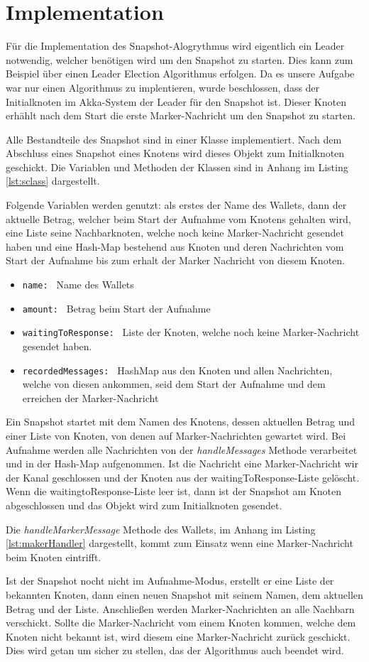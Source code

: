 \section{Implementation}
\label{sec:impl}
Für die Implementation des Snapshot-Alogrythmus wird eigentlich ein Leader 
notwendig, welcher benötigen wird um den Snapshot zu starten. Dies kann zum
Beispiel über einen Leader Election Algorithmus erfolgen. Da es unsere Aufgabe
war nur einen Algorithmus zu implentieren, wurde beschlossen, dass der 
Initialknoten im Akka-System der Leader für den Snapshot ist. Dieser Knoten 
erhählt nach dem Start die erste Marker-Nachricht um den Snapshot zu starten.

Alle Bestandteile des Snapshot sind in einer Klasse implementiert. Nach dem
Abschluss eines Snapshot eines Knotens wird dieses Objekt zum Initialknoten
geschickt.
Die Variablen und Methoden der Klassen sind in Anhang im Listing \ref{lst:sclass} 
dargestellt.

Folgende Variablen werden genutzt: als erstes der Name des Wallets, dann
der aktuelle Betrag, welcher beim Start der Aufnahme vom Knotens gehalten wird,
eine Liste seine Nachbarknoten, welche noch keine Marker-Nachricht gesendet
haben und eine Hash-Map bestehend aus Knoten und deren Nachrichten vom Start
der Aufnahme bis zum erhalt der Marker Nachricht von diesem Knoten.

\begin{itemize}
 \item \texttt{name: } Name des Wallets
 \item \texttt{amount: } Betrag beim Start der Aufnahme
 \item \texttt{waitingToResponse: } Liste der Knoten, welche noch keine 
 Marker-Nachricht gesendet haben.
 \item \texttt{recordedMessages: } HashMap aus den Knoten und allen Nachrichten, 
 welche von diesen ankommen, seid dem Start der Aufnahme und dem erreichen der
 Marker-Nachricht
\end{itemize}

Ein Snapshot startet mit dem Namen des Knotens, dessen aktuellen Betrag und 
einer Liste von Knoten, von denen auf Marker-Nachrichten gewartet wird.
Bei Aufnahme werden alle Nachrichten von der \textit{handleMessages} Methode
verarbeitet und in der Hash-Map aufgenommen.
Ist die Nachricht eine Marker-Nachricht wir der Kanal geschlossen und der
Knoten aus der waitingToResponse-Liste gelöscht.
Wenn die waitingtoResponse-Liste leer ist, dann ist der Snapshot am Knoten
abgeschlossen und das Objekt wird zum Initialknoten gesendet.

Die \textit{handleMarkerMessage} Methode des Wallets, im Anhang im Listing 
\ref{lst:makerHandler} dargestellt, kommt zum Einsatz wenn eine Marker-Nachricht
beim Knoten eintrifft.

Ist der Snapshot nocht nicht im Aufnahme-Modus, erstellt er eine Liste der
bekannten Knoten, dann einen neuen Snapshot mit seinem Namen, dem aktuellen
Betrag und der Liste. Anschließen werden Marker-Nachrichten an alle Nachbarn
verschickt.
Sollte die Marker-Nachricht vom einem Knoten kommen, welche dem Knoten nicht
bekannt ist, wird diesem eine Marker-Nachricht zurück geschickt.
Dies wird getan um sicher zu stellen, das der Algorithmus auch beendet wird.
